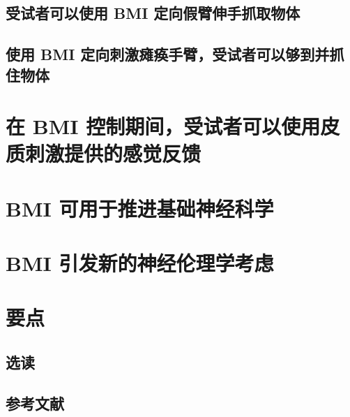 \subsection{受试者可以使用 BMI 定向假臂伸手抓取物体}
\subsection{使用 BMI 定向刺激瘫痪手臂，受试者可以够到并抓住物体}

\section{在 BMI 控制期间，受试者可以使用皮质刺激提供的感觉反馈}

\section{BMI 可用于推进基础神经科学}

\section{BMI 引发新的神经伦理学考虑}

\section{要点}
\subsection{选读}
\subsection{参考文献}

